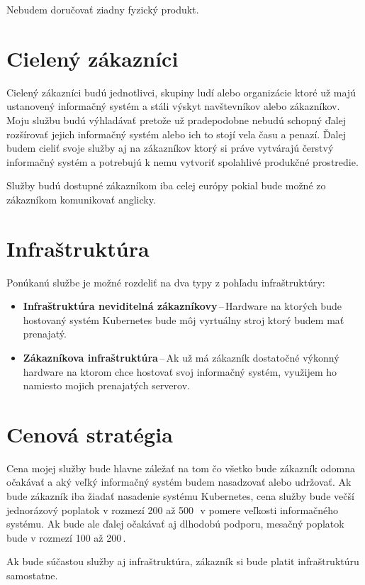 Nebudem doručovať ziadny fyzický produkt.

\section{Cielený zákazníci}

Cielený zákazníci budú jednotlivci, skupiny ludí alebo organizácie ktoré už majú ustanovený informačný systém a stáli výskyt navštevníkov alebo zákazníkov. Moju službu budú výhladávať pretože už pradepodobne nebudú schopný ďalej rozšírovať jejich informačný systém alebo ich to stojí vela času a penazí. Ďalej budem cieliť svoje služby aj na zákazníkov ktorý si práve vytvárajú čerstvý informačný systém a potrebujú k nemu vytvoriť spolahlivé produkčné prostredie.

Služby budú dostupné zákazníkom iba celej európy pokial bude možné zo zákazníkom komunikovať anglicky.

\section{Infraštruktúra}

Ponúkanú službe je možné rozdeliť na dva typy z pohľadu infraštruktúry:
\begin{itemize}
  \item \textbf{Infraštruktúra neviditelná zákazníkovy}\,--\,Hardware na ktorých bude hostovaný systém Kubernetes bude môj vyrtuálny stroj ktorý budem mať prenajatý.
  \item \textbf{Zákazníkova infraštruktúra}\,--\,Ak už má zákazník dostatočné výkonný hardware na ktorom chce hostovať svoj informačný systém, využijem ho namiesto mojich prenajatých serverov.
\end{itemize}

\section{Cenová stratégia}

Cena mojej služby bude hlavne záležať na tom čo všetko bude zákazník odomna očakávať a aký veľký informačný systém budem nasadzovať alebo udržovať. Ak bude zákazník iba žiadať nasadenie systému Kubernetes, cena služby bude večší jednorázový poplatok v rozmezí 200 až 500\,\texteuro\ v pomere veľkosti informačného systému. Ak bude ale ďalej očakávať aj dlhodobú podporu, mesačný poplatok bude v rozmezí 100 až 200\,\texteuro.

Ak bude súčastou služby aj infraštruktúra, zákazník si bude platit infraštruktúru samostatne.

